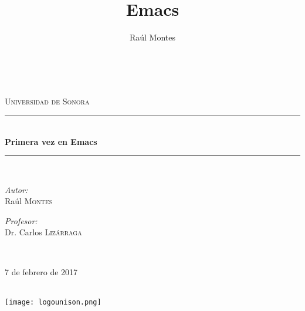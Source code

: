 \documentclass[11pt]{article}
\title{Emacs}
\author{Raúl Montes}
\begin{document}
\begin{titlepage}
\newcommand{\HRule}{\rule{\linewidth}{0.5mm}}
\center
\textsc{\LARGE Universidad de Sonora}\\[1.5cm]
\HRule \\[0.4cm]
{ \huge \bfseries Primera vez en Emacs}\\[0.4cm] 
\HRule \\[1.1cm]
\begin{minipage}{0.4\textwidth}
\begin{flushleft} \large
\emph{Autor:}\\
Raúl \textsc{Montes} 
\end{flushleft}
\end{minipage}
\begin{minipage}{0.4\textwidth}
\begin{flushright} \large
\emph{Profesor:} \\
Dr. Carlos \textsc{Lizárraga} 
\end{flushright}
\end{minipage}\\[1.5cm]
{\date\ 7 de febrero de 2017\large }\\[2cm] 
\texttt{[image: logounison.png]}\\[1cm] 
\end{titlepage}
\end{document}
